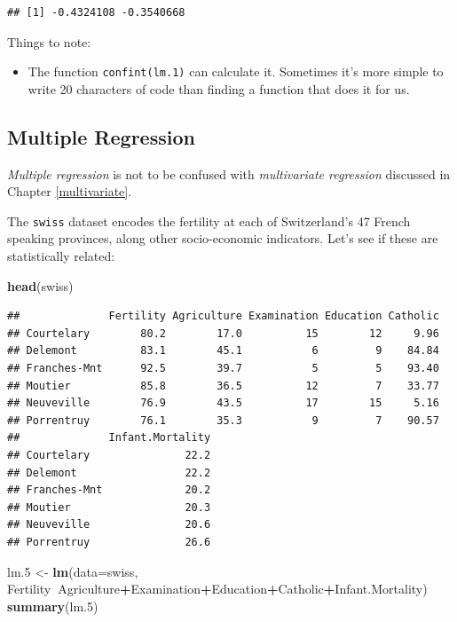 \documentclass[]{book}
\newenvironment{Shaded}{\begin{snugshade}}{\end{snugshade}}
\newcommand{\DataTypeTok}[1]{\textcolor[rgb]{0.13,0.29,0.53}{#1}}
\newcommand{\FloatTok}[1]{\textcolor[rgb]{0.00,0.00,0.81}{#1}}
\newcommand{\KeywordTok}[1]{\textcolor[rgb]{0.13,0.29,0.53}{\textbf{#1}}}
\newcommand{\NormalTok}[1]{#1}
\newcommand{\OperatorTok}[1]{\textcolor[rgb]{0.81,0.36,0.00}{\textbf{#1}}}
\newcommand{\StringTok}[1]{\textcolor[rgb]{0.31,0.60,0.02}{#1}}
\providecommand{\tightlist}{%
  \setlength{\itemsep}{0pt}\setlength{\parskip}{0pt}}
\theoremstyle{definition}
\theoremstyle{definition}
\theoremstyle{definition}
\theoremstyle{remark}
\let\BeginKnitrBlock\begin \let\EndKnitrBlock\end
\begin{document}
\begin{verbatim}
## [1] -0.4324108 -0.3540668
\end{verbatim}

Things to note:

\begin{itemize}
\tightlist
\item
  The function \texttt{confint(lm.1)} can calculate it. Sometimes it's more simple to write 20 characters of code than finding a function that does it for us.
\end{itemize}

\hypertarget{multiple-regression}{%
\subsection{Multiple Regression}\label{multiple-regression}}

\BeginKnitrBlock{remark}
{}\emph{Multiple regression} is not to be confused with \emph{multivariate regression} discussed in Chapter \ref{multivariate}.
\EndKnitrBlock{remark}

The \texttt{swiss} dataset encodes the fertility at each of Switzerland's 47 French speaking provinces, along other socio-economic indicators. Let's see if these are statistically related:

\begin{Shaded}
\begin{Highlighting}[]
\KeywordTok{head}\NormalTok{(swiss)}
\end{Highlighting}
\end{Shaded}

\begin{verbatim}
##              Fertility Agriculture Examination Education Catholic
## Courtelary        80.2        17.0          15        12     9.96
## Delemont          83.1        45.1           6         9    84.84
## Franches-Mnt      92.5        39.7           5         5    93.40
## Moutier           85.8        36.5          12         7    33.77
## Neuveville        76.9        43.5          17        15     5.16
## Porrentruy        76.1        35.3           9         7    90.57
##              Infant.Mortality
## Courtelary               22.2
## Delemont                 22.2
## Franches-Mnt             20.2
## Moutier                  20.3
## Neuveville               20.6
## Porrentruy               26.6
\end{verbatim}

\begin{Shaded}
\begin{Highlighting}[]
\NormalTok{lm}\FloatTok{.5}\NormalTok{ <-}\StringTok{ }\KeywordTok{lm}\NormalTok{(}\DataTypeTok{data=}\NormalTok{swiss, Fertility}\OperatorTok{~}\NormalTok{Agriculture}\OperatorTok{+}\NormalTok{Examination}\OperatorTok{+}\NormalTok{Education}\OperatorTok{+}\NormalTok{Catholic}\OperatorTok{+}\NormalTok{Infant.Mortality)}
\KeywordTok{summary}\NormalTok{(lm}\FloatTok{.5}\NormalTok{)}
\end{Highlighting}
\end{Shaded}
\end{document}
